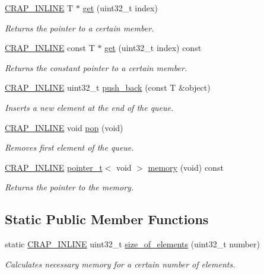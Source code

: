 \begin{DoxyCompactItemize}
\hyperlink{config__x86_8h_a5a40526b8d842e7ff731509998bb0f1c}{C\+R\+A\+P\+\_\+\+I\+N\+L\+I\+N\+E} T $\ast$ \hyperlink{classcrap_1_1queue_a8eee8f0edc723a6dc7ba1e8be021e002}{get} (uint32\+\_\+t index)
\begin{DoxyCompactList}\small\item\em Returns the pointer to a certain member. \end{DoxyCompactList}\item 
\hyperlink{config__x86_8h_a5a40526b8d842e7ff731509998bb0f1c}{C\+R\+A\+P\+\_\+\+I\+N\+L\+I\+N\+E} const T $\ast$ \hyperlink{classcrap_1_1queue_a4133910c272a5d782b69e13b7d36eb95}{get} (uint32\+\_\+t index) const 
\begin{DoxyCompactList}\small\item\em Returns the constant pointer to a certain member. \end{DoxyCompactList}\item 
\hyperlink{config__x86_8h_a5a40526b8d842e7ff731509998bb0f1c}{C\+R\+A\+P\+\_\+\+I\+N\+L\+I\+N\+E} uint32\+\_\+t \hyperlink{classcrap_1_1queue_a87a4fc114cdda80b141479e7e79062c2}{push\+\_\+back} (const T \&object)
\begin{DoxyCompactList}\small\item\em Inserts a new element at the end of the queue. \end{DoxyCompactList}\item 
\hyperlink{config__x86_8h_a5a40526b8d842e7ff731509998bb0f1c}{C\+R\+A\+P\+\_\+\+I\+N\+L\+I\+N\+E} void \hyperlink{classcrap_1_1queue_a756c0f0d8e0655c0c8a2e8967a7ebf8b}{pop} (void)
\begin{DoxyCompactList}\small\item\em Removes first element of the queue. \end{DoxyCompactList}\item 
\hyperlink{config__x86_8h_a5a40526b8d842e7ff731509998bb0f1c}{C\+R\+A\+P\+\_\+\+I\+N\+L\+I\+N\+E} \hyperlink{structcrap_1_1pointer__t}{pointer\+\_\+t}$<$ void $>$ \hyperlink{classcrap_1_1queue_a38886e5433650f3cd48ca6c4ad05d7a1}{memory} (void) const 
\begin{DoxyCompactList}\small\item\em Returns the pointer to the memory. \end{DoxyCompactList}\end{DoxyCompactItemize}
\subsection*{Static Public Member Functions}
\begin{DoxyCompactItemize}
\item 
static \hyperlink{config__x86_8h_a5a40526b8d842e7ff731509998bb0f1c}{C\+R\+A\+P\+\_\+\+I\+N\+L\+I\+N\+E} uint32\+\_\+t \hyperlink{classcrap_1_1queue_ad91ad0cfc447bbc6212af33c0505e5c6}{size\+\_\+of\+\_\+elements} (uint32\+\_\+t number)
\begin{DoxyCompactList}\small\item\em Calculates necessary memory for a certain number of elements. \end{DoxyCompactList}\end{DoxyCompactItemize}
